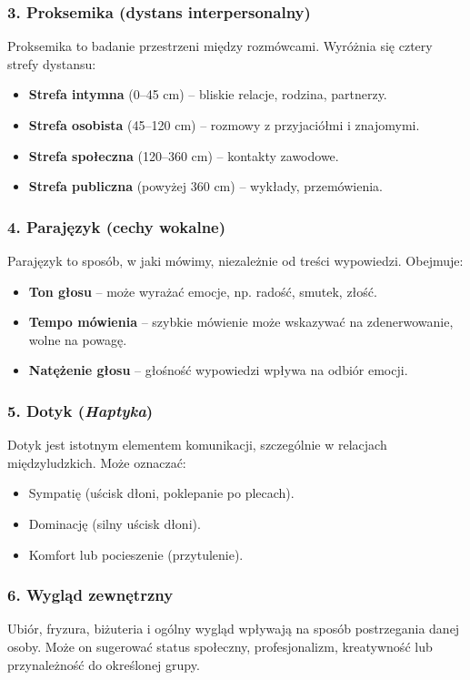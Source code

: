 \subsubsection{3. Proksemika (dystans interpersonalny)}
Proksemika to badanie przestrzeni między rozmówcami. Wyróżnia się cztery strefy dystansu:
\begin{itemize}
    \item \textbf{Strefa intymna} (0–45 cm) – bliskie relacje, rodzina, partnerzy.
    \item \textbf{Strefa osobista} (45–120 cm) – rozmowy z przyjaciółmi i znajomymi.
    \item \textbf{Strefa społeczna} (120–360 cm) – kontakty zawodowe.
    \item \textbf{Strefa publiczna} (powyżej 360 cm) – wykłady, przemówienia.
\end{itemize}

\subsubsection{4. Parajęzyk (cechy wokalne)}
Parajęzyk to sposób, w jaki mówimy, niezależnie od treści wypowiedzi. Obejmuje:
\begin{itemize}
    \item \textbf{Ton głosu} – może wyrażać emocje, np. radość, smutek, złość.
    \item \textbf{Tempo mówienia} – szybkie mówienie może wskazywać na zdenerwowanie, wolne na powagę.
    \item \textbf{Natężenie głosu} – głośność wypowiedzi wpływa na odbiór emocji.
\end{itemize}

\subsubsection{5. Dotyk (\textit{Haptyka})}
Dotyk jest istotnym elementem komunikacji, szczególnie w relacjach międzyludzkich. Może oznaczać:
\begin{itemize}
    \item Sympatię (uścisk dłoni, poklepanie po plecach).
    \item Dominację (silny uścisk dłoni).
    \item Komfort lub pocieszenie (przytulenie).
\end{itemize}

\subsubsection{6. Wygląd zewnętrzny}
Ubiór, fryzura, biżuteria i ogólny wygląd wpływają na sposób postrzegania danej osoby. Może on sugerować status społeczny, profesjonalizm, kreatywność lub przynależność do określonej grupy.

